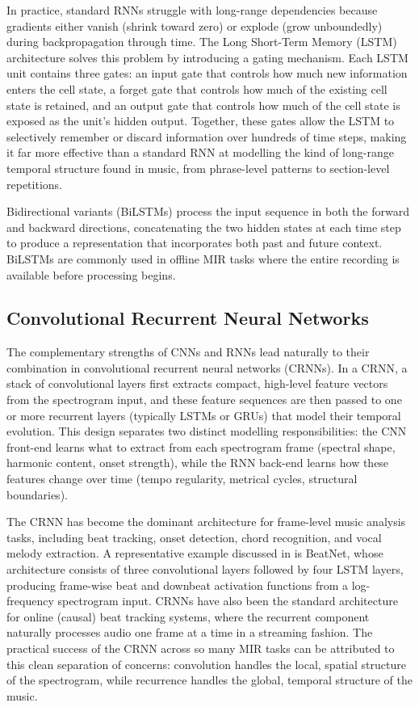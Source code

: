 In practice, standard RNNs struggle with long-range dependencies because gradients either vanish (shrink toward zero) or explode (grow unboundedly) during backpropagation through time. The Long Short-Term Memory (LSTM) architecture solves this problem by introducing a gating mechanism. Each LSTM unit contains three gates: an input gate that controls how much new information enters the cell state, a forget gate that controls how much of the existing cell state is retained, and an output gate that controls how much of the cell state is exposed as the unit's hidden output.\cite{hendrikpurwins20191}   Together, these gates allow the LSTM to selectively remember or discard information over hundreds of time steps, making it far more effective than a standard RNN at modelling the kind of long-range temporal structure found in music, from phrase-level patterns to section-level repetitions.

Bidirectional variants (BiLSTMs) process the input sequence in both the forward and backward directions, concatenating the two hidden states at each time step to produce a representation that incorporates both past and future context. BiLSTMs are commonly used in offline MIR tasks where the entire recording is available before processing begins.\cite{hendrikpurwins20191}  

\subsection{Convolutional Recurrent Neural Networks}

The complementary strengths of CNNs and RNNs lead naturally to their combination in convolutional recurrent neural networks (CRNNs). In a CRNN, a stack of convolutional layers first extracts compact, high-level feature vectors from the spectrogram input, and these feature sequences are then passed to one or more recurrent layers (typically LSTMs or GRUs) that model their temporal evolution.  This design separates two distinct modelling responsibilities: the CNN front-end learns what to extract from each spectrogram frame (spectral shape, harmonic content, onset strength), while the RNN back-end learns how these features change over time (tempo regularity, metrical cycles, structural boundaries).\cite{hendrikpurwins20191} 

The CRNN has become the dominant architecture for frame-level music analysis tasks, including beat tracking, onset detection, chord recognition, and vocal melody extraction.\cite{hendrikpurwins20191}   A representative example discussed in  is BeatNet, whose architecture consists of three convolutional layers followed by four LSTM layers, producing frame-wise beat and downbeat activation functions from a log-frequency spectrogram input.\cite{mojtabaheydari20245}   CRNNs have also been the standard architecture for online (causal) beat tracking systems, where the recurrent component naturally processes audio one frame at a time in a streaming fashion.\cite{chang2024beast}   The practical success of the CRNN across so many MIR tasks can be attributed to this clean separation of concerns: convolution handles the local, spatial structure of the spectrogram, while recurrence handles the global, temporal structure of the music.

